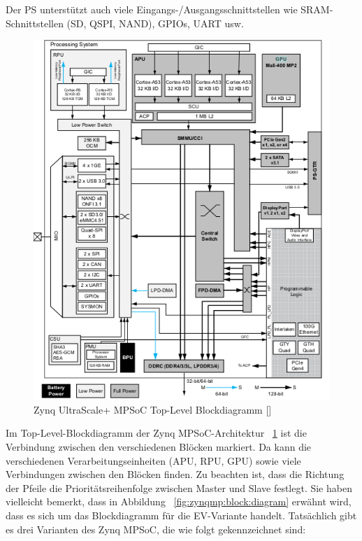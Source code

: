 Der PS unterstützt auch viele Eingangs-/Ausgangsschnittstellen wie SRAM-Schnittstellen (SD, QSPI, NAND), GPIOs, UART usw.

\begin{figure}[H]
	\begin{center}
		\includegraphics[width=1\textwidth]{./images/top-level_zynqmp.jpg}
	\end{center}
	\vspace{-5pt}
	\caption[Zynq UltraScale+ MPSoC Top-Level Blockdiagramm]{Zynq UltraScale+ MPSoC Top-Level Blockdiagramm [\cite{XilinxInc.2019}]} %
	\label{fig:zynqmp:top:level}
	\vspace{-5pt}
\end{figure}

Im Top-Level-Blockdiagramm der Zynq MPSoC-Architektur ~\ref{fig:zynqmp:top:level} ist die Verbindung zwischen den verschiedenen Blöcken markiert. Da kann die verschiedenen Verarbeitungseinheiten (APU, RPU, GPU) sowie viele Verbindungen zwischen den Blöcken finden. Zu beachten ist, dass die Richtung der Pfeile die Prioritätsreihenfolge zwischen Master und Slave festlegt.
Sie haben vielleicht bemerkt, dass in Abbildung ~\ref{fig:zynqmp:block:diagram} erwähnt wird, dass es sich um das Blockdiagramm für die EV-Variante handelt. Tatsächlich gibt es drei Varianten des Zynq MPSoC, die wie folgt gekennzeichnet sind:

